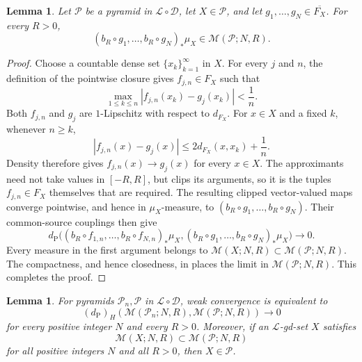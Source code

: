 \documentclass{amsart}
\theoremstyle{plain}
\newtheorem{lemma}[theorem]{Lemma}
\theoremstyle{definition}
\theoremstyle{remark}
\newcommand{\D}{\mathcal{D}}
\newcommand{\M}{\mathcal{M}}
\renewcommand{\L}{\mathcal{L}}
\newcommand{\dpr}{d_{\operatorname{P}}}
\newcommand{\haus}[1]{\left(#1\right)_H}
\begin{document}
\begin{lemma}
\label{lem:pointwise-closure-ordered-measurement}
Let $\mathcal P$ be a pyramid in $\L\circ\D$, let $X\in\mathcal P$, and
let $g_1,\ldots,g_N\in\overline{F_X}$.  For every $R>0$,
\[ (b_R\circ g_1,\ldots,b_R\circ g_N)_*\mu_X \in\M(\mathcal P;N,R). \]
\end{lemma}

\begin{proof}
Choose a countable dense set $\{x_k\}_{k=1}^{\infty}$ in $X$.  For every
$j$ and $n$, the definition of the pointwise closure gives
$f_{j,n}\in F_X$ such that
\[
\max_{1\leq k\leq n}|f_{j,n}(x_k)-g_j(x_k)|<\frac1n.
\]
Both $f_{j,n}$ and $g_j$ are $1$-Lipschitz with respect to $d_{F_X}$.
For $x\in X$ and a fixed $k$, whenever $n\geq k$,
\[ |f_{j,n}(x)-g_j(x)| \leq2d_{F_X}(x,x_k)+\frac1n. \]
Density therefore gives $f_{j,n}(x)\to g_j(x)$ for every $x\in X$.
The approximants need not take values in $[-R,R]$, but
 clips its arguments, so it is the tuples
$f_{j,n}\in F_X$ themselves that are required.  The resulting
clipped vector-valued maps converge pointwise, and hence in
$\mu_X$-measure, to $(b_R\circ g_1,\ldots,b_R\circ g_N)$.  Their
common-source couplings then give
\[
\dpr\bigl((b_R\circ f_{1,n},\ldots,b_R\circ f_{N,n})_*\mu_X,
(b_R\circ g_1,\ldots,b_R\circ g_N)_*\mu_X\bigr)\longrightarrow0.
\]
Every measure in the first argument belongs to
$\M(X;N,R)\subset\M(\mathcal P;N,R)$.  The compactness, and hence
closedness, in  places the limit
in $\M(\mathcal P;N,R)$.  This completes the proof.
\end{proof}

\begin{lemma}
\label{lem:pyramid-measurement-convergence}
For pyramids $\mathcal P_n,\mathcal P$ in $\L\circ\D$, weak convergence is
equivalent to
\[\haus{\dpr}(\M(\mathcal P_n;N,R),\M(\mathcal P;N,R))\longrightarrow0\]
for every positive integer $N$ and every $R>0$.  Moreover, if an
$\L$-gd-set $X$ satisfies
\[\M(X;N,R)\subset\M(\mathcal P;N,R)\]
for all positive integers $N$ and all $R>0$, then $X\in\mathcal P$.
\end{lemma}
\end{document}
